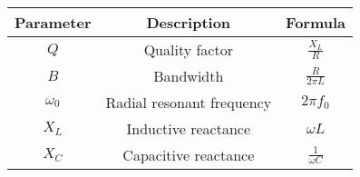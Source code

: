 \setlength{\arrayrulewidth}{0.3mm}
\setlength{\tabcolsep}{20pt}
\renewcommand{\arraystretch}{1.5}


\begin{tabular}{|c|c|c|}
\hline
Parameter & Description & Formula\\
\hline
$Q$ & Quality factor & $\frac{X_L}{R}$\\
\hline
$B$ & Bandwidth & $\frac{R}{2 \pi L}$\\
\hline
$\omega_0$ & Radial resonant frequency & $2 \pi f_0$\\
\hline
$X_L$ & Inductive reactance & $\omega L$\\
\hline
$X_C$ & Capacitive reactance & $\frac{1}{\omega C}$\\
\hline

\end{tabular}
